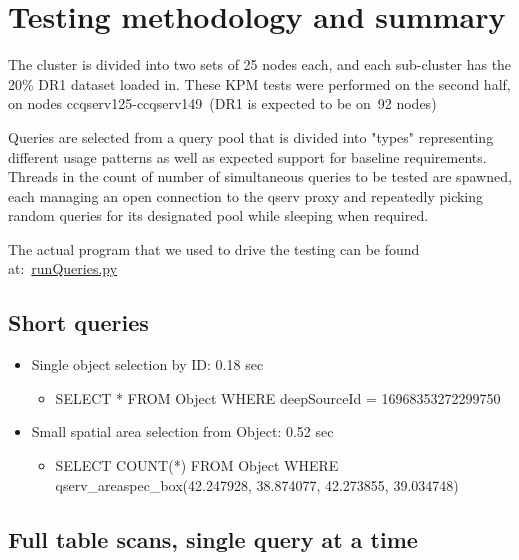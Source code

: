 \documentclass[DM,toc]{lsstdoc}
\begin{document}
\section{Testing methodology and
summary}\label{testing-methodology-and-summary}

The cluster is divided into two sets of 25 nodes each, and each
sub-cluster has the 20\% DR1 dataset loaded in. These KPM tests were
performed on the second half, on nodes ccqserv125-ccqserv149~(DR1 is
expected to be on~92 nodes)

Queries are selected from a query pool that is divided into "types"
representing different usage patterns as well as expected support for
baseline requirements. Threads in the count of number of simultaneous
queries to be tested are spawned, each managing an open connection to
the qserv proxy and repeatedly picking random queries for its designated
pool while sleeping when required.

The actual program that we used to drive the testing can be found
at:~\href{https://github.com/lsst/qserv/blob/master/admin/tools/docker/deployment/in2p3/runQueries.py}{runQueries.py}

\subsection{\texorpdfstring{\textbf{Short
queries}}{Short queries}}\label{short-queries}

\begin{itemize}
\item
  Single object selection by ID: 0.18 sec

  \begin{itemize}
  \item
    SELECT * FROM Object WHERE deepSourceId = 16968353272299750
  \end{itemize}
\item
  Small spatial area selection from Object: 0.52 sec

  \begin{itemize}
  \item
    SELECT COUNT(*) FROM Object WHERE qserv\_areaspec\_box(42.247928,
    38.874077, 42.273855, 39.034748)
  \end{itemize}
\end{itemize}

\subsection{\texorpdfstring{\textbf{Full table scans, single query at
a
time}}{Full table scans, single query at a time}}\label{full-table-scans-single-query-at-a-time}
\end{document}
